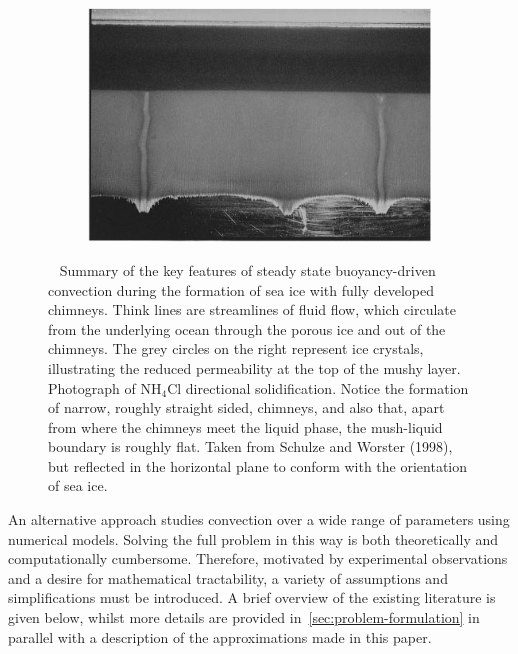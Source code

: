 \documentclass[11pt]{proc}
\begin{document}
\begin{figure}[t]
\begin{subfigure}[t]{.55\linewidth}
    \caption{}
    \label{subfig:convection-in-sea-ice}
\end{subfigure}
\quad
\begin{subfigure}[t]{.42\linewidth}
   \centering
    \includegraphics[width=\linewidth]{mushy-layer-chimneys-photo-schulze-worster.jpg}
    \caption{}
    \label{subfig:schulze-worster-photo}
\end{subfigure}

\caption{~ Summary of the key features of steady state buoyancy-driven convection during the formation of sea ice with fully developed chimneys. Think lines are streamlines of fluid flow, which circulate from the underlying ocean through the porous ice and out of the chimneys. The grey circles on the right represent ice crystals, illustrating the reduced permeability at the top of the mushy layer.~ Photograph of $\textrm{NH}_4\textrm{Cl}$ directional solidification. Notice the formation of narrow, roughly straight sided, chimneys, and also that, apart from where the chimneys meet the liquid phase, the mush-liquid boundary is roughly flat. Taken from Schulze and Worster (1998), but reflected in the horizontal plane to conform with the orientation of sea ice.}

 \label{fig:overview-diagram-photo}

\end{figure}


An alternative approach studies convection over a wide range of parameters using numerical models. Solving the full problem in this way is both theoretically and computationally cumbersome. Therefore, motivated by experimental observations and a desire for mathematical tractability, a variety of assumptions and simplifications must be introduced. A brief overview of the existing literature is given below, whilst more details are provided in~\autoref{sec:problem-formulation} in parallel with a description of the approximations made in this paper.
\end{document}
